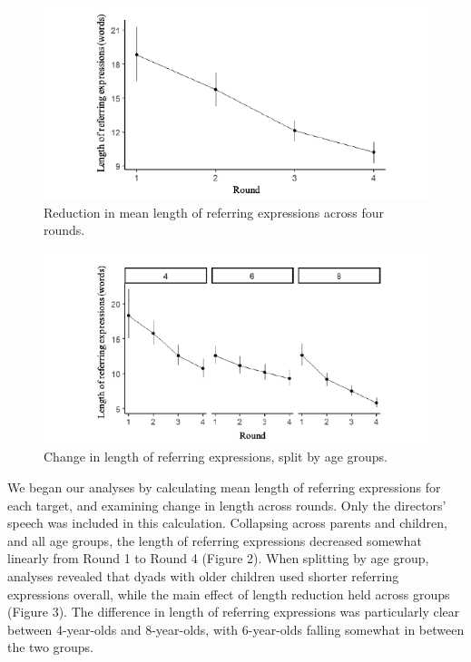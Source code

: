 \documentclass[10pt, letterpaper]{article}
\newenvironment{CodeChunk}{}{}
\begin{document}
\begin{CodeChunk}
\begin{figure}[b]

{\centering \includegraphics{figs/reduction-1} 

}

\caption[Reduction in mean length of referring expressions across four rounds]{Reduction in mean length of referring expressions across four rounds.}\label{fig:reduction}
\end{figure}
\end{CodeChunk}

\begin{CodeChunk}
\begin{figure}[h]

{\centering \includegraphics{figs/development-1} 

}

\caption[Change in length of referring expressions, split by age groups]{Change in length of referring expressions, split by age groups.}\label{fig:development}
\end{figure}
\end{CodeChunk}

We began our analyses by calculating mean length of referring
expressions for each target, and examining change in length across
rounds. Only the directors' speech was included in this calculation.
Collapsing across parents and children, and all age groups, the length
of referring expressions decreased somewhat linearly from Round 1 to
Round 4 (Figure 2). When splitting by age group, analyses revealed that
dyads with older children used shorter referring expressions overall,
while the main effect of length reduction held across groups (Figure 3).
The difference in length of referring expressions was particularly clear
between 4-year-olds and 8-year-olds, with 6-year-olds falling somewhat
in between the two groups.
\end{document}

